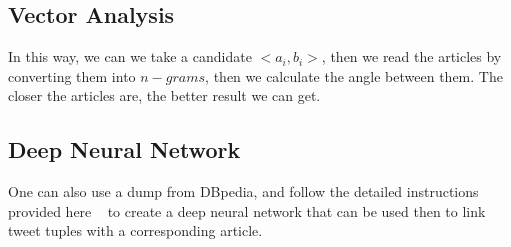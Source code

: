 \subsection{ Vector Analysis }
In this way, we can we take a candidate $<a_i, b_i>$, then we read the articles by converting them into $n-grams$, 
then we calculate the angle between them. The closer the articles are, the better result we can get. 

\subsection{ Deep Neural Network } 
One can also use a dump from DBpedia, and follow the detailed instructions provided here ~\cite{ref1DeepLearning} 
to create a deep neural network that can be used then to link tweet tuples with a corresponding article.

\endinput